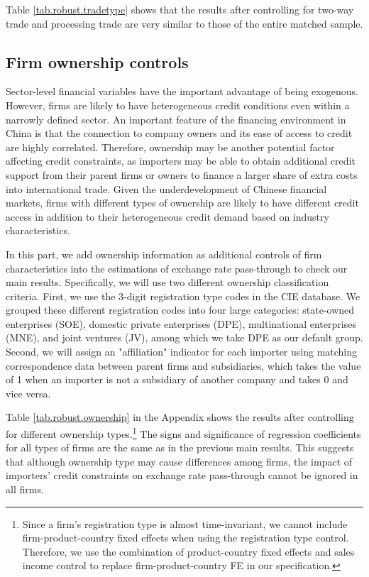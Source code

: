 \documentclass[12pt]{article}
\begin{document}
Table \ref{tab.robust.tradetype} shows that the results after controlling for two-way trade and processing trade are very similar to those of the entire matched sample.

\subsection{Firm ownership controls}

Sector-level financial variables have the important advantage of being exogenous. However, firms are likely to have heterogeneous credit conditions even within a narrowly defined sector. An important feature of the financing environment in China is that the connection to company owners and its ease of access to credit are highly correlated. Therefore, ownership may be another potential factor affecting credit constraints, as importers may be able to obtain additional credit support from their parent firms or owners to finance a larger share of extra costs into international trade. Given the underdevelopment of Chinese financial markets, firms with different types of ownership are likely to have different credit access in addition to their heterogeneous credit demand based on industry characteristics. 

In this part, we add ownership information as additional controls of firm characteristics into the estimations of exchange rate pass-through to check our main results. Specifically, we will use two different ownership classification criteria. First, we use the 3-digit registration type codes in the CIE database. We grouped these different registration codes into four large categories: state-owned enterprises (SOE), domestic private enterprises (DPE), multinational enterprises (MNE), and joint ventures (JV), among which we take DPE as our default group. Second, we will assign an "affiliation" indicator for each importer using matching correspondence data between parent firms and subsidiaries, which takes the value of 1 when an importer is not a subsidiary of another company and takes 0 and vice versa. 

Table \ref{tab.robust.ownership} in the Appendix shows the results after controlling for different ownership types.\footnote{Since a firm's registration type is almost time-invariant, we cannot include firm-product-country fixed effects when using the registration type control. Therefore, we use the combination of product-country fixed effects and sales income control to replace firm-product-country FE in our specification.} The signs and significance of regression coefficients for all types of firms are the same as in the previous main results. This suggests that although ownership type may cause differences among firms, the impact of importers' credit constraints on exchange rate pass-through cannot be ignored in all firms.
\end{document}

